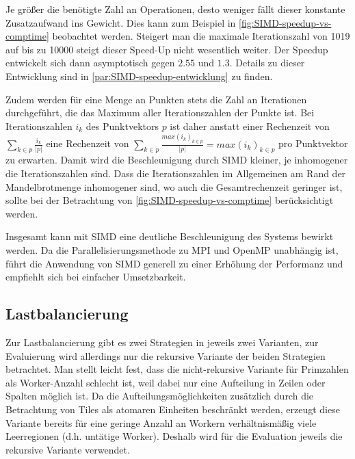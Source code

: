 Je größer die benötigte Zahl an Operationen, desto weniger fällt dieser konstante Zusatzaufwand ins Gewicht.
Dies kann zum Beispiel in \autoref{fig:SIMD-speedup-vs-comptime} beobachtet werden.
Steigert man die maximale Iterationszahl von 1019 auf bis zu 10000 steigt dieser Speed-Up nicht wesentlich weiter.
Der Speedup entwickelt sich dann asymptotisch gegen $2.55$ und $1.3$. Details zu dieser Entwicklung sind in \autoref{par:SIMD-speedup-entwicklung} zu finden.

Zudem werden für eine Menge an Punkten stets die Zahl an Iterationen durchgeführt,
die das Maximum aller Iterationszahlen der Punkte ist.
Bei Iterationszahlen \(i_k\) des Punktvektors \(p\) ist daher
anstatt einer Rechenzeit von \(\sum_{k \in p} \frac{i_k }{ | p | }\) eine Rechenzeit von
\(\sum_{k \in p} \frac{max(i_k)_{k \in p }}{|p|} = max(i_k)_{k \in p }\) pro Punktvektor zu erwarten.
Damit wird die Beschleunigung durch SIMD kleiner, je inhomogener die Iterationszahlen sind.
Dass die Iterationszahlen im Allgemeinen am Rand der Mandelbrotmenge inhomogener sind,
wo auch die Gesamtrechenzeit geringer ist, sollte bei der Betrachtung von \autoref{fig:SIMD-speedup-vs-comptime} berücksichtigt werden.


Insgesamt kann mit SIMD eine deutliche Beschleunigung des Systems bewirkt werden.
Da die Parallelisierungsmethode zu MPI und OpenMP unabhängig ist, führt die Anwendung von SIMD generell
zu einer Erhöhung der Performanz und empfiehlt sich bei einfacher Umsetzbarkeit.

\subsection{Lastbalancierung}\label{sec:lastbalancierung_eval}
Zur Lastbalancierung gibt es zwei Strategien in jeweils zwei Varianten, zur Evaluierung wird allerdings nur die rekursive Variante der beiden Strategien betrachtet.
Man stellt leicht fest, dass die nicht-rekursive Variante für Primzahlen als Worker-Anzahl schlecht ist, weil dabei nur eine Aufteilung in Zeilen oder Spalten möglich ist.
Da die Aufteilungsmöglichkeiten zusätzlich durch die Betrachtung von Tiles als atomaren Einheiten beschränkt werden, erzeugt diese Variante bereits für eine geringe Anzahl an Workern verhältnismäßig viele Leerregionen (d.h. untätige Worker).
Deshalb wird für die Evaluation jeweils die rekursive Variante verwendet.

